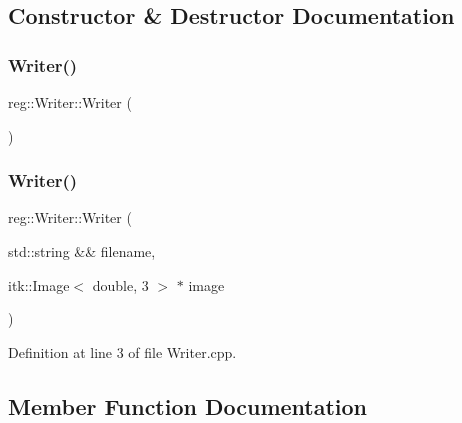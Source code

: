 \subsection{Constructor \& Destructor Documentation}
\mbox{\label{structreg_1_1_writer_af4772fac6913708ed8ad4292a908ef7f}} 
\subsubsection{\texorpdfstring{Writer()}{Writer()}\hspace{0.1cm}{\footnotesize\ttfamily [1/2]}}
{\footnotesize\ttfamily reg\+::\+Writer\+::\+Writer (\begin{DoxyParamCaption}{ }\end{DoxyParamCaption})\hspace{0.3cm}{\ttfamily [default]}}

\mbox{\label{structreg_1_1_writer_afbce1fdc6153a79d9affc3c3c0b8b28c}} 
\subsubsection{\texorpdfstring{Writer()}{Writer()}\hspace{0.1cm}{\footnotesize\ttfamily [2/2]}}
{\footnotesize\ttfamily reg\+::\+Writer\+::\+Writer (\begin{DoxyParamCaption}\item[{std\+::string \&\&}]{filename,  }\item[{itk\+::\+Image$<$ double, 3 $>$ $\ast$}]{image }\end{DoxyParamCaption})}



Definition at line 3 of file Writer.\+cpp.



\subsection{Member Function Documentation}
\mbox{\label{structreg_1_1_writer_abc483635c322211e5e0e8789e4a21a1c}} 
